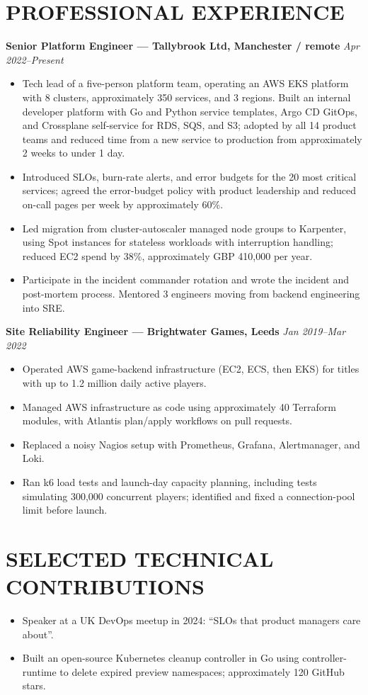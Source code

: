 \documentclass[11pt,a4paper]{article}
\begin{document}
\section*{PROFESSIONAL EXPERIENCE}
\textbf{Senior Platform Engineer --- Tallybrook Ltd, Manchester / remote} \hfill \textit{Apr 2022--Present}
\begin{itemize}
\item Tech lead of a five-person platform team, operating an AWS EKS platform with 8 clusters, approximately 350 services, and 3 regions. Built an internal developer platform with Go and Python service templates, Argo CD GitOps, and Crossplane self-service for RDS, SQS, and S3; adopted by all 14 product teams and reduced time from a new service to production from approximately 2 weeks to under 1 day.
\item Introduced SLOs, burn-rate alerts, and error budgets for the 20 most critical services; agreed the error-budget policy with product leadership and reduced on-call pages per week by approximately 60\%.
\item Led migration from cluster-autoscaler managed node groups to Karpenter, using Spot instances for stateless workloads with interruption handling; reduced EC2 spend by 38\%, approximately GBP 410,000 per year.
\item Participate in the incident commander rotation and wrote the incident and post-mortem process. Mentored 3 engineers moving from backend engineering into SRE.
\end{itemize}

\textbf{Site Reliability Engineer --- Brightwater Games, Leeds} \hfill \textit{Jan 2019--Mar 2022}
\begin{itemize}
\item Operated AWS game-backend infrastructure (EC2, ECS, then EKS) for titles with up to 1.2 million daily active players.
\item Managed AWS infrastructure as code using approximately 40 Terraform modules, with Atlantis plan/apply workflows on pull requests.
\item Replaced a noisy Nagios setup with Prometheus, Grafana, Alertmanager, and Loki.
\item Ran k6 load tests and launch-day capacity planning, including tests simulating 300,000 concurrent players; identified and fixed a connection-pool limit before launch.
\end{itemize}

\section*{SELECTED TECHNICAL CONTRIBUTIONS}
\begin{itemize}
\item Speaker at a UK DevOps meetup in 2024: “SLOs that product managers care about”.
\item Built an open-source Kubernetes cleanup controller in Go using controller-runtime to delete expired preview namespaces; approximately 120 GitHub stars.
\end{itemize}
\end{document}
